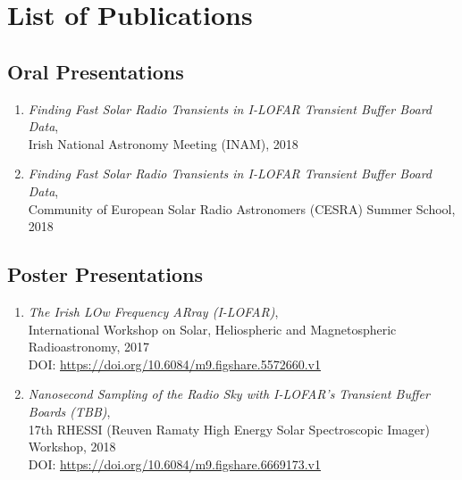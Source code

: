 




\chapter{List of Publications}
\label{chapter:publications}
%
\begin{singlespace}
\vspace{-5mm}

%
\section*{Oral Presentations}
\begin{enumerate}
\item \textit{Finding Fast Solar Radio Transients in I-LOFAR Transient Buffer Board Data},\\ Irish National Astronomy Meeting (INAM), 2018
\item \textit{Finding Fast Solar Radio Transients in I-LOFAR Transient Buffer Board Data},\\ Community of European Solar Radio Astronomers (CESRA) Summer School, 2018
\end{enumerate}

%
\section*{Poster Presentations}
\begin{enumerate}
\item \textit{The Irish LOw Frequency ARray (I-LOFAR)}, \\ International Workshop on Solar, Heliospheric and Magnetospheric Radioastronomy, 2017
\\ DOI: \url{https://doi.org/10.6084/m9.figshare.5572660.v1}
\item \textit{Nanosecond Sampling of the Radio Sky with I-LOFAR's Transient Buffer Boards (TBB)}, \\ 17th RHESSI (Reuven Ramaty High Energy Solar Spectroscopic Imager) Workshop, 2018
\\ DOI: \url{https://doi.org/10.6084/m9.figshare.6669173.v1}
\end{enumerate}



\end{singlespace}
